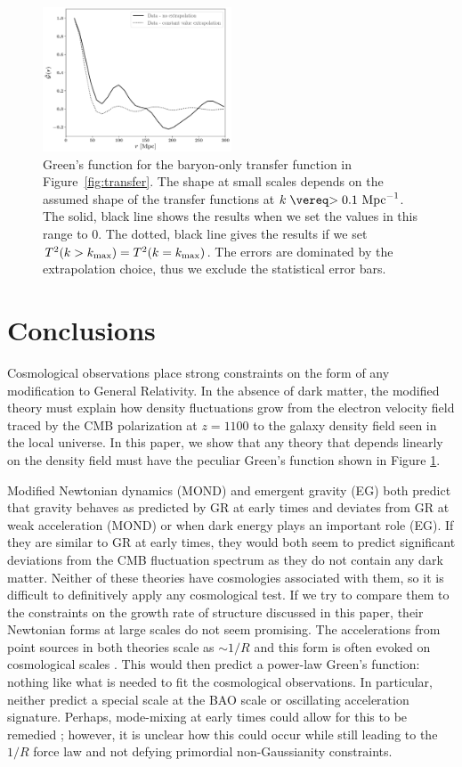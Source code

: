 \documentclass[floats,floatfix,showpacs,amssymb,amsmath,prl,twocolumn,superscriptaddress,nofootinbib, aps]{revtex4-2}
\begin{document}
\begin{figure}[!htb]
    \centering
    \includegraphics[width=0.5\textwidth]{greens.pdf}
    \caption{Green's function for the baryon-only transfer function in Figure~\ref{fig:transfer}. The shape at small scales depends on the assumed shape of the transfer functions at $k \gtrsim 0.1~\rm{Mpc}^{-1}$. The solid, black line shows the results when we set the values in this range to $0$. The dotted, black line gives the results if we set $T^2(k>k_{\rm{max}}) = T^2(k = k_{\rm{max}})$. The errors are dominated by the extrapolation choice, thus we exclude the statistical error bars.}
    \label{fig:greens}
\end{figure}

\section{Conclusions \label{sec:conclusions}}
Cosmological observations place strong constraints on the form of any modification to General Relativity. In the absence of dark matter, the modified theory must explain how density fluctuations grow from the electron velocity field traced by the CMB polarization at $z=1100$ to the galaxy density field seen in the local universe. In this paper, we show that any theory that depends linearly on the density field must have the peculiar Green's function shown in Figure \ref{fig:greens}.  

Modified Newtonian dynamics (MOND) \citep{Milgrom1983} and emergent gravity (EG) \citep{Verlinde2017} both predict that gravity behaves as predicted by GR at early times and deviates from GR at weak acceleration (MOND) or when dark energy plays an important role (EG).  If they are similar to GR at early times, they would both seem to predict significant deviations from the CMB fluctuation spectrum as they do not contain any dark matter. Neither of these theories have cosmologies associated with them, so it is difficult to definitively apply any cosmological test. If we try to compare them to the constraints on the growth rate of structure discussed in this paper, their Newtonian forms at large scales do not seem promising. The accelerations from point sources in both theories scale as $\sim 1/R$ and this form is often evoked on cosmological scales \citep{Nusser2002,Llinares2008}. This would then predict a power-law Green's function: nothing like what is needed to fit the cosmological observations. In particular, neither predict a special scale at the BAO scale or oscillating acceleration signature. Perhaps, mode-mixing at early times could allow for this to be remedied \citep{McGaugh2004}; however, it is unclear how this could occur while still leading to the $1/R$ force law and not defying primordial non-Gaussianity constraints.
\end{document}
